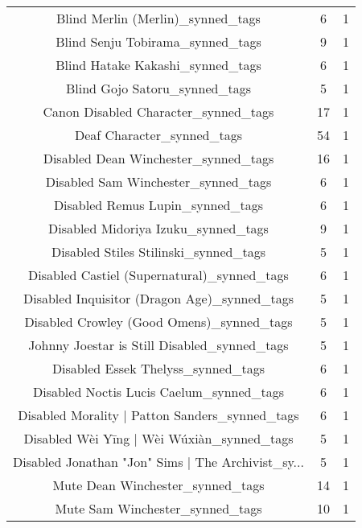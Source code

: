 \begin{table}[h!]
{\begin{tabular}{|c|c|c|}
                 Blind Merlin (Merlin)\_synned\_tags &           6 &          1 \\
                  Blind Senju Tobirama\_synned\_tags &           9 &          1 \\
                  Blind Hatake Kakashi\_synned\_tags &           6 &          1 \\
                     Blind Gojo Satoru\_synned\_tags &           5 &          1 \\
              Canon Disabled Character\_synned\_tags &          17 &          1 \\
                        Deaf Character\_synned\_tags &          54 &          1 \\
              Disabled Dean Winchester\_synned\_tags &          16 &          1 \\
               Disabled Sam Winchester\_synned\_tags &           6 &          1 \\
                  Disabled Remus Lupin\_synned\_tags &           6 &          1 \\
               Disabled Midoriya Izuku\_synned\_tags &           9 &          1 \\
             Disabled Stiles Stilinski\_synned\_tags &           5 &          1 \\
       Disabled Castiel (Supernatural)\_synned\_tags &           6 &          1 \\
      Disabled Inquisitor (Dragon Age)\_synned\_tags &           5 &          1 \\
         Disabled Crowley (Good Omens)\_synned\_tags &           5 &          1 \\
      Johnny Joestar is Still Disabled\_synned\_tags &           5 &          1 \\
                Disabled Essek Thelyss\_synned\_tags &           6 &          1 \\
          Disabled Noctis Lucis Caelum\_synned\_tags &           6 &          1 \\
    Disabled Morality | Patton Sanders\_synned\_tags &           6 &          1 \\
        Disabled Wèi Yīng | Wèi Wúxiàn\_synned\_tags &           5 &          1 \\
Disabled Jonathan "Jon" Sims | The Archivist\_sy... &           5 &          1 \\
                  Mute Dean Winchester\_synned\_tags &          14 &          1 \\
                   Mute Sam Winchester\_synned\_tags &          10 &          1 \\

\end{tabular}}
\end{table}
